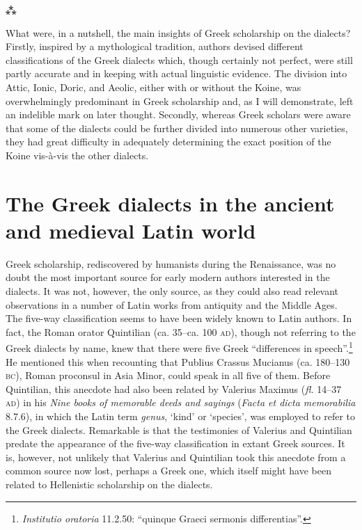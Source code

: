 \begin{center}
\Large⁂
\end{center}

What were, in a nutshell, the main insights of Greek scholarship on the dialects? Firstly, inspired by a mythological tradition, authors devised different classifications of the Greek dialects which, though certainly not perfect, were still partly accurate and in keeping with actual linguistic evidence. The division into Attic, Ionic, Doric, and Aeolic, either with or without the Koine, was overwhelmingly predominant in Greek scholarship and, as I will demonstrate, left an indelible mark on later thought. Secondly, whereas Greek scholars were aware that some of the dialects could be further divided into numerous other varieties, they had great difficulty in adequately determining the exact position of the Koine vis-à-vis the other dialects.

\section{The Greek dialects in the ancient and medieval Latin world}\label{sec:2.5}

Greek scholarship, rediscovered by humanists during the Renaissance, was no doubt the most important source for early modern authors interested in the dialects. It was not, however, the only source, as they could also read relevant observations in a number of Latin works from antiquity and the Middle Ages. The five-way classification seems to have been widely known to Latin authors. In fact, the Roman orator Quintilian (ca. 35–ca. 100 \textsc{ad}), though not referring to the Greek dialects by name, knew that there were five Greek “differences in speech”.\footnote{{\textit{Institutio oratoria}} {11.2.50: “quinque Graeci sermonis differentias”.}} He mentioned this when recounting that Publius Crassus Mucianus (ca. 180–130 \textsc{bc}), Roman proconsul in Asia Minor, could speak in all five of them. Before Quintilian, this anecdote had also been related by Valerius Maximus (\textit{fl.} 14–37 \textsc{ad}) in his \textit{Nine books of memorable deeds and sayings} (\textit{Facta et dicta memorabilia} 8.7.6), in which the Latin term \textit{genus}, ‘kind’ or ‘species’, was employed to refer to the Greek dialects. Remarkable is that the testimonies of Valerius and Quintilian predate the appearance of the five-way classification in extant Greek sources. It is, however, not unlikely that Valerius and Quintilian took this anecdote from a common source now lost, perhaps a Greek one, which itself might have been related to Hellenistic scholarship on the dialects.

